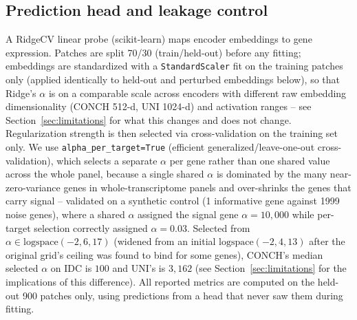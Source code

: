 \documentclass[11pt]{article}
\begin{document}
\subsection{Prediction head and leakage control}
A RidgeCV linear probe (scikit-learn) maps encoder embeddings to gene expression. Patches are split 70/30 (train/held-out) before any fitting; embeddings are standardized with a \texttt{StandardScaler} fit on the training patches only (applied identically to held-out and perturbed embeddings below), so that Ridge's $\alpha$ is on a comparable scale across encoders with different raw embedding dimensionality (CONCH 512-d, UNI 1024-d) and activation ranges -- see Section~\ref{sec:limitations} for what this changes and does not change. Regularization strength is then selected via cross-validation on the training set only. We use \texttt{alpha\_per\_target=True} (efficient generalized/leave-one-out cross-validation), which selects a separate $\alpha$ per gene rather than one shared value across the whole panel, because a single shared $\alpha$ is dominated by the many near-zero-variance genes in whole-transcriptome panels and over-shrinks the genes that carry signal -- validated on a synthetic control (1 informative gene against 1999 noise genes), where a shared $\alpha$ assigned the signal gene $\alpha=10{,}000$ while per-target selection correctly assigned $\alpha=0.03$. Selected from $\alpha\in\text{logspace}(-2,6,17)$ (widened from an initial $\text{logspace}(-2,4,13)$ after the original grid's ceiling was found to bind for some genes), CONCH's median selected $\alpha$ on IDC is $100$ and UNI's is $3{,}162$ (see Section~\ref{sec:limitations} for the implications of this difference). All reported metrics are computed on the held-out 900 patches only, using predictions from a head that never saw them during fitting.
\end{document}
